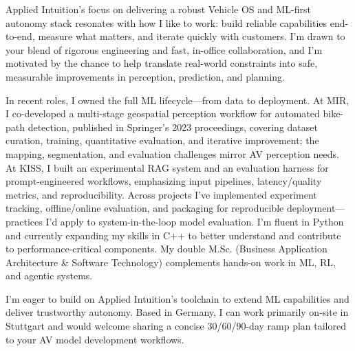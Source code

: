 Applied Intuition’s focus on delivering a robust Vehicle OS and ML-first autonomy stack resonates with how I like to work: build reliable capabilities end-to-end, measure what matters, and iterate quickly with customers. I’m drawn to your blend of rigorous engineering and fast, in-office collaboration, and I’m motivated by the chance to help translate real-world constraints into safe, measurable improvements in perception, prediction, and planning.

In recent roles, I owned the full ML lifecycle—from data to deployment. At MIR, I co-developed a multi-stage geospatial perception workflow for automated bike-path detection, published in Springer’s 2023 proceedings, covering dataset curation, training, quantitative evaluation, and iterative improvement; the mapping, segmentation, and evaluation challenges mirror AV perception needs. At KISS, I built an experimental RAG system and an evaluation harness for prompt-engineered workflows, emphasizing input pipelines, latency/quality metrics, and reproducibility. Across projects I’ve implemented experiment tracking, offline/online evaluation, and packaging for reproducible deployment—practices I’d apply to system-in-the-loop model evaluation. I’m fluent in Python and currently expanding my skills in C++ to better understand and contribute to performance-critical components. My double M.Sc. (Business Application Architecture \& Software Technology) complements hands-on work in ML, RL, and agentic systems.

I’m eager to build on Applied Intuition’s toolchain to extend ML capabilities and deliver trustworthy autonomy. Based in Germany, I can work primarily on-site in Stuttgart and would welcome sharing a concise 30/60/90-day ramp plan tailored to your AV model development workflows.